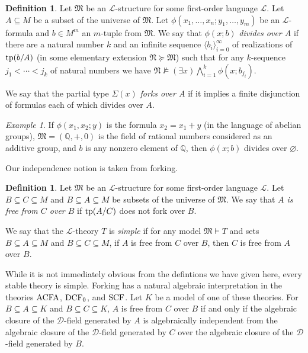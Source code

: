 \documentclass{amsart}
\newcommand{\ACFA}{{\rm ACFA}}
\newcommand{\DCF}{{\rm DCF}}
\newcommand{\SCF}{{\rm SCF}}
\newcommand{\QQ}{{\mathbb Q}}
\newcommand{\cD}{{\mathcal D}}
\newcommand{\cL}{{\mathcal L}}
\newcommand{\fM}{{\mathfrak M}}
\newcommand{\fN}{{\mathfrak N}}
\newcommand{\tp}{{\rm tp}}
\theoremstyle{definition}
\newtheorem{Def}[thm]{Definition}
\theoremstyle{remark}
\newtheorem{Example}[thm]{Example}
\begin{document}
\begin{Def}
Let $\fM$ be an $\cL$-structure for some first-order language $\cL$.  Let $A \subseteq M$ be
a subset of the universe of $\fM$.  Let $\phi(x_1, \ldots, x_n;y_1, \ldots, y_m)$ 
be an $\cL$-formula and $b \in M^m$ an $m$-tuple from $\fM$.  We say that 
$\phi(x;b)$ \emph{divides over $A$} if there are a natural number $k$ and an infinite 
sequence $\langle b_i \rangle_{i=0}^\infty$ of realizations of $\tp(b/A)$ (in some elementary 
extension $\fN \succeq \fM$) such that for any $k$-sequence $j_1 < \cdots < j_k$ of natural numbers 
we have $\fN \not \models (\exists x) \bigwedge_{i=1}^k \phi(x;b_{j_i})$.

We say that the partial type $\Sigma(x)$ \emph{forks over $A$}  if it implies a finite disjunction of formulas
each of which divides over $A$. 
\end{Def}

\begin{Example}
If $\phi(x_1,x_2;y)$ is the formula $x_2 = x_1 + y$ (in the language of abelian groups), 
$\fM = (\QQ, +, 0)$ is the field of rational numbers considered as an additive group, 
and $b$ is any nonzero element of $\QQ$, then $\phi(x;b)$ divides over $\varnothing$.
\end{Example}

Our independence notion is taken from forking.

\begin{Def}
Let $\fM$ be an $\cL$-structure for some first-order language $\cL$. 
Let $B \subseteq C \subseteq M$  and 
$B \subseteq A \subseteq M$ be subsets of the universe of $\fM$.
We say that \emph{$A$ is free from $C$ over $B$} if $\tp(A/C)$ does not fork over $B$.

We say that the $\cL$-theory $T$ is \emph{simple} if for any model $\fM \models T$ and 
sets $B \subseteq A \subseteq M$ and $B \subseteq C \subseteq M$, if 
$A$ is free from $C$ over $B$, then $C$ is free from $A$ over $B$.
\end{Def}

While it is not immediately obvious from the defintions we have given here, every 
stable theory is simple.  Forking has a natural algebraic interpretation in the 
theories $\ACFA$, $\DCF_0$, and $\SCF$.  Let $K$ be a model of one of these
theories.  For $B \subseteq A \subseteq K$ and $B \subseteq C \subseteq K$, $A$ is 
free from $C$ over $B$ if and only if the algebraic closure of the $\cD$-field 
generated by $A$ is algebraically independent from the algebraic closure of the $\cD$-field
generated by $C$ over the algebraic closure of the $\cD$-field generated by $B$.  
\end{document}
